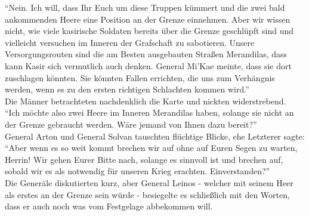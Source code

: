 ``Nein. Ich will, dass Ihr Euch um diese Truppen kümmert und die zwei bald ankommenden Heere
eine Position an der Grenze einnehmen. Aber wir wissen nicht, wie viele kasirische Soldaten bereits 
über die Grenze geschlüpft sind und vielleicht versuchen im Inneren der Grafschaft zu sabotieren. 
Unsere Versorgungsrouten sind die am Besten ausgebauten Straßen Merandilas, dass kann Kasir sich 
vermutlich auch denken. General Mi'Kae meinte, dass sie dort zuschlagen könnten. Sie könnten Fallen 
errichten, die uns zum Verhängnis werden, wenn es zu den ersten richtigen Schlachten kommen 
wird.''\\
Die Männer betrachteten nachdenklich die Karte und nickten widerstrebend.\\
``Ich möchte also zwei Heere im Inneren Merandilas haben, solange sie nicht an der Grenze gebraucht 
werden. Wäre jemand von Ihnen dazu bereit?''\\
General Arton und General Solvan tauschten flüchtige Blicke, ehe Letzterer sagte: ``Aber wenn es so 
weit kommt brechen wir auf ohne auf Euren Segen zu warten, Herrin! Wir gehen Eurer Bitte nach, 
solange es sinnvoll ist und brechen auf, sobald wir es als notwendig für unseren Krieg erachten. 
Einverstanden?''\\
Die Generäle diskutierten kurz, aber General Leinos - welcher mit seinem Heer als erstes an der 
Grenze sein würde - besiegelte es schließlich mit den Worten, dass er auch noch was vom Festgelage 
abbekommen will.\\


